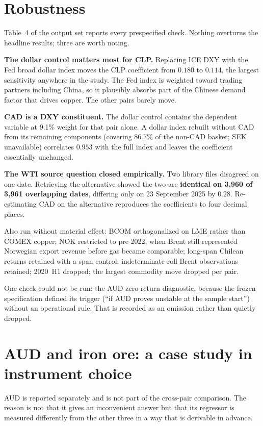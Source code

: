 \documentclass[11pt,a4paper]{article}
\begin{document}
\section{Robustness}

Table~4 of the output set reports every prespecified check. Nothing overturns
the headline results; three are worth noting.

\textbf{The dollar control matters most for CLP.} Replacing ICE DXY with the Fed
broad dollar index moves the CLP coefficient from $0.180$ to $0.114$, the
largest sensitivity anywhere in the study. The Fed index is weighted toward
trading partners including China, so it plausibly absorbs part of the Chinese
demand factor that drives copper. The other pairs barely move.

\textbf{CAD is a DXY constituent.} The dollar control contains the dependent
variable at 9.1\% weight for that pair alone. A dollar index rebuilt without CAD
from its remaining components (covering 86.7\% of the non-CAD basket; SEK
unavailable) correlates $0.953$ with the full index and leaves the coefficient
essentially unchanged.

\textbf{The WTI source question closed empirically.} Two library files disagreed
on one date. Retrieving the alternative showed the two are \textbf{identical on
3{,}960 of 3{,}961 overlapping dates}, differing only on 23 September 2025 by
$0.28$. Re-estimating CAD on the alternative reproduces the coefficients to four
decimal places.

Also run without material effect: BCOM orthogonalized on LME rather than COMEX
copper; NOK restricted to pre-2022, when Brent still represented Norwegian
export revenue before gas became comparable; long-span Chilean returns retained
with a span control; indeterminate-roll Brent observations retained; 2020~H1
dropped; the largest commodity move dropped per pair.

One check could not be run: the AUD zero-return diagnostic, because the frozen
specification defined its trigger (``if AUD proves unstable at the sample
start'') without an operational rule. That is recorded as an omission rather
than quietly dropped.

\section{AUD and iron ore: a case study in instrument choice}
\label{sec:aud}

AUD is reported separately and is not part of the cross-pair comparison. The
reason is not that it gives an inconvenient answer but that its regressor is
measured differently from the other three in a way that is derivable in advance.
\end{document}
